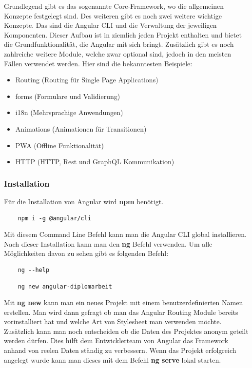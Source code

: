Grundlegend gibt es das sogenannte Core-Framework, wo die allgemeinen Konzepte festgelegt sind. Des weiteren gibt es noch zwei weitere wichtige Konzepte. Das sind die Angular CLI und die Verwaltung der jeweiligen Komponenten. Dieser Aufbau ist in ziemlich jeden Projekt enthalten und bietet die Grundfunktionalität, die Angular mit sich bringt. Zusätzlich gibt es noch zahlreiche weitere Module, welche zwar optional sind, jedoch in den meisten Fällen verwendet werden. Hier sind die bekanntesten Beispiele:

\begin{itemize}
    \item Routing  (Routing für Single Page Applications)
    \item forms (Formulare und Validierung)
    \item i18n (Mehrsprachige Anwendungen)
    \item Animations (Animationen für Transitionen)
    \item PWA  (Offline Funktionalität)
    \item HTTP (HTTP, Rest und GraphQL Kommunikation)
\end{itemize}
\newpage
\subsubsection{Installation}
Für die Installation von Angular wird \textbf{npm} benötigt.

\begin{lstlisting}
    npm i -g @angular/cli
\end{lstlisting}

Mit diesem Command Line Befehl kann man die Angular CLI global installieren. Nach dieser Installation kann man den \textbf{ng} Befehl verwenden. Um alle Möglichkeiten davon zu sehen gibt es folgenden Befehl:

\begin{lstlisting}
    ng --help
\end{lstlisting}
\newline
\begin{lstlisting}
    ng new angular-diplomarbeit
\end{lstlisting}

Mit \textbf{ng new} kann man ein neues Projekt mit einem benutzerdefinierten Namen erstellen. Man wird dann gefragt ob man das Angular Routing Module bereits vorinstalliert hat und welche Art von Stylesheet man verwenden möchte. Zusätzlich kann man noch entscheiden ob die Daten des Projektes anonym geteilt werden dürfen. Dies hilft dem Entwicklerteam von Angular das Framework anhand von reelen Daten ständig zu verbessern. Wenn das Projekt erfolgreich angelegt wurde kann man dieses mit dem Befehl \textbf{ng serve} lokal starten.


